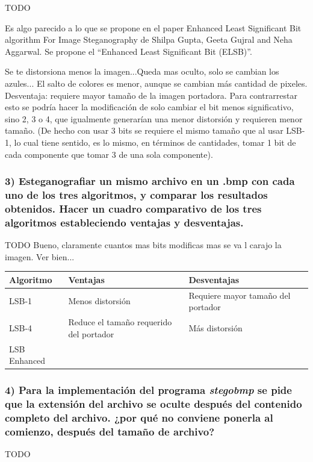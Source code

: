 \documentclass[a4paper,10pt]{article}
\begin{document}
TODO

Es algo parecido a lo que se propone en el paper Enhanced Least Significant Bit algorithm For Image Steganography de 
Shilpa Gupta, Geeta Gujral and Neha Aggarwal. Se propone el “Enhanced Least Significant Bit (ELSB)”. 

Se te distorsiona menos la imagen...Queda mas oculto, solo se cambian los azules...
El salto de colores es menor, aunque se cambian más cantidad de pixeles.
Desventaja: requiere mayor tamaño de la imagen portadora. Para contrarrestar esto se podría hacer la modificación de solo
cambiar el bit menos significativo, sino 2, 3 o 4, que igualmente generarían una menor distorsión y requieren menor tamaño. 
(De hecho con usar 3 bits se requiere el mismo tamaño que al usar LSB-1, lo cual tiene sentido, es lo mismo, en términos de cantidades, tomar 1 bit de cada componente que 
tomar 3 de una sola componente).

\subsubsection*{ 3) Esteganografiar un mismo archivo en un .bmp con cada uno de los tres algoritmos, y comparar
los resultados obtenidos. Hacer un cuadro comparativo de los tres algoritmos estableciendo ventajas y desventajas.}

TODO
Bueno, claramente cuantos mas bits modificas mas se va l carajo la imagen. Ver bien...

\begin{tabular}[\baselineskip]{|l|p{7cm}|p{7cm}|p{7cm}}
    \hline
    Algoritmo & Ventajas & Desventajas \\
    \hline
    LSB-1 &  Menos distorsión & Requiere mayor tamaño del portador \\
    \hline
    LSB-4 & Reduce el tamaño requerido del portador & Más distorsión \\
    \hline
    LSB Enhanced &  & \\
    \hline
\end{tabular} 


\subsubsection*{ 4) Para la implementación del programa \textit{stegobmp} se pide que la extensión del archivo se oculte
después del contenido completo del archivo. ¿por qué no conviene ponerla al comienzo, después del tamaño de archivo?}

TODO
\end{document}
